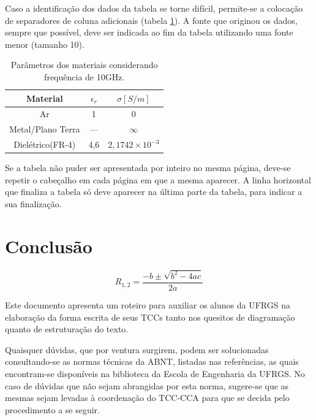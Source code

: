 \documentclass[repeatfields,xlists,xpacks,oneside]{ufrgscca}
\begin{document}
Caso a identificação dos dados da tabela se torne difícil, permite-se a
colocação de separadores de coluna adicionais (tabela \ref{tabvert}). A fonte que
originou os dados, sempre que possível, deve ser indicada ao fim da tabela
utilizando uma fonte menor (tamanho 10).

\begin{table}[htb]
  \begin{center}
  \caption{Parâmetros dos materiais considerando frequência de 10GHz.}\label{tabvert}
  \begin{tabular}{c|c|c}
  \hline
  Material		& $\epsilon_r$	& $\sigma[S/m]$\\
  \hline
  Ar			& 1		& 0\\
  Metal/Plano Terra 	& --- 		& $\infty$\\
  Dielétrico(FR-4) 	& 4,6		& $2,1742\times10^{-3}$\\
  \hline
  \end{tabular}
	\end{center}
{}
\end{table}

Se a tabela não puder ser apresentada por inteiro no mesma página, deve-se
repetir o cabeçalho em cada página em que a mesma aparecer. A linha horizontal que
finaliza a tabela só deve aparecer na última parte da tabela, para indicar a
sua finalização.


\chapter{Conclusão}
\label{conclusao}

\begin{equation}
    R_{1,2}=\frac{-b\pm\sqrt{b^2-4ac}}{2a}
\end{equation}


Este documento apresenta um roteiro para auxiliar os
alunos da UFRGS na elaboração da forma escrita de seus TCCs
 tanto nos quesitos de diagramação quanto de
estruturação do texto.

Quaisquer dúvidas, que por ventura surgirem, podem ser solucionadas
consultando-se as normas técnicas da ABNT, listadas nas referências, as
quais encontram-se disponíveis na biblioteca da Escola de Engenharia da
UFRGS. No caso de dúvidas que não sejam abrangidas por esta norma, sugere-se
que as mesmas sejam levadas à coordenação do TCC-CCA para que se decida pelo
procedimento a se seguir.


\printbibliography
\end{document}
